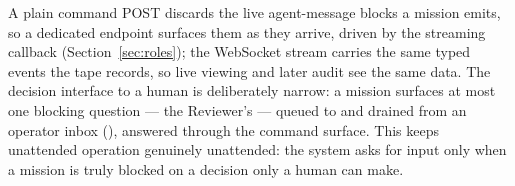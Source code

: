 A plain command POST discards the live agent-message blocks a mission emits, so a
dedicated  endpoint surfaces them as they arrive, driven by
the  streaming callback (Section~\ref{sec:roles}); the
WebSocket stream carries the same typed events the tape records, so live viewing
and later audit see the same data. The decision interface to a human is
deliberately narrow: a mission surfaces at most one blocking question --- the
Reviewer's  --- queued to and drained from an operator
inbox (), answered through the command surface.
This keeps unattended operation genuinely unattended: the system asks for input
only when a mission is truly blocked on a decision only a human can make.
